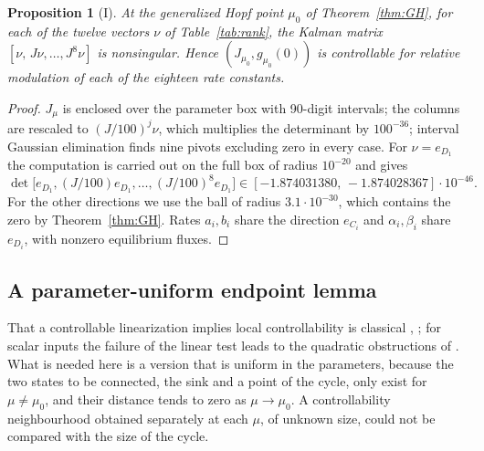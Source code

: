 \documentclass[11pt,a4paper]{article}
\theoremstyle{plain}
\newtheorem{proposition}[theorem]{Proposition}
\theoremstyle{definition}
\theoremstyle{remark}
\newcommand{\evI}{\textsf{I}}
\begin{document}
\begin{proposition}[\evI]\label{prop:rank}
At the generalized Hopf point $\mu_0$ of Theorem~\ref{thm:GH}, for each of the twelve vectors $\nu$ of Table~\ref{tab:rank}, the Kalman matrix $[\nu,\,J\nu,\dots,J^8\nu]$ is nonsingular. Hence $(J_{\mu_0},g_{\mu_0}(0))$ is controllable for relative modulation of each of the eighteen rate constants.
\end{proposition}
\begin{proof}
$J_\mu$ is enclosed over the parameter box with 90-digit intervals; the columns are rescaled to $(J/100)^j\nu$, which multiplies the determinant by $100^{-36}$; interval Gaussian elimination finds nine pivots excluding zero in every case. For $\nu=e_{D_1}$ the computation is carried out on the full box of radius $10^{-20}$ and gives
\[
\det\bigl[e_{D_1},(J/100)e_{D_1},\dots,(J/100)^8e_{D_1}\bigr]\in[-1.874031380,\,-1.874028367]\cdot10^{-46}.
\]
For the other directions we use the ball of radius $3.1\cdot10^{-30}$, which contains the zero by Theorem~\ref{thm:GH}. Rates $a_i,b_i$ share the direction $e_{C_i}$ and $\alpha_i,\beta_i$ share $e_{D_i}$, with nonzero equilibrium fluxes.
\end{proof}

\begin{table}[t]
\centering\small

\caption{Scaled Kalman determinants $\det[\nu,(J/100)\nu,\dots,(J/100)^8\nu]$ at the generalized Hopf point for the input direction $\nu$ of each rate constant (\evI; midpoints of enclosures whose relative width is below $10^{-6}$). The magnitudes reflect the scaling and the stiffness of $J$ and are not estimates of control effort.}
\label{tab:rank}
\end{table}

\subsection{A parameter-uniform endpoint lemma}
That a controllable linearization implies local controllability is classical \cite[Section~3.7]{Sontag98}, \cite[Theorem~3.8]{Coron07}; for scalar inputs the failure of the linear test leads to the quadratic obstructions of \cite{BeauchardMarbach18}. What is needed here is a version that is uniform in the parameters, because the two states to be connected, the sink and a point of the cycle, only exist for $\mu\neq\mu_0$, and their distance tends to zero as $\mu\to\mu_0$. A controllability neighbourhood obtained separately at each $\mu$, of unknown size, could not be compared with the size of the cycle.
\end{document}
